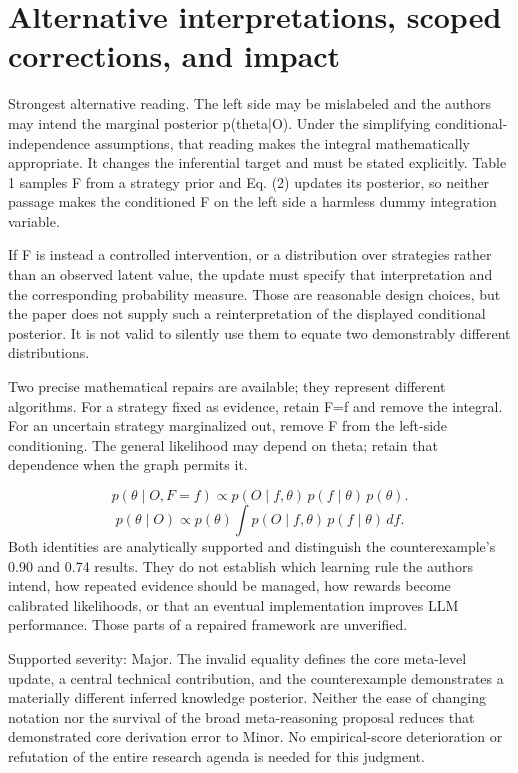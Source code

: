 \documentclass[10pt]{article}
\begin{document}
\section*{Alternative interpretations, scoped corrections, and impact}
Strongest alternative reading. The left side may be mislabeled and the authors may intend the marginal posterior p(theta|O). Under the simplifying conditional-independence assumptions, that reading makes the integral mathematically appropriate. It changes the inferential target and must be stated explicitly. Table 1 samples F from a strategy prior and Eq. (2) updates its posterior, so neither passage makes the conditioned F on the left side a harmless dummy integration variable.\par
If F is instead a controlled intervention, or a distribution over strategies rather than an observed latent value, the update must specify that interpretation and the corresponding probability measure. Those are reasonable design choices, but the paper does not supply such a reinterpretation of the displayed conditional posterior. It is not valid to silently use them to equate two demonstrably different distributions.\par
Two precise mathematical repairs are available; they represent different algorithms. For a strategy fixed as evidence, retain F=f and remove the integral. For an uncertain strategy marginalized out, remove F from the left-side conditioning. The general likelihood may depend on theta; retain that dependence when the graph permits it.\par
\[p(\theta\mid O,F=f)\propto p(O\mid f,\theta)\,p(f\mid\theta)\,p(\theta).\] \[p(\theta\mid O)\propto p(\theta)\int p(O\mid f,\theta)\,p(f\mid\theta)\,df.\] Both identities are analytically supported and distinguish the counterexample’s 0.90 and 0.74 results. They do not establish which learning rule the authors intend, how repeated evidence should be managed, how rewards become calibrated likelihoods, or that an eventual implementation improves LLM performance. Those parts of a repaired framework are unverified.\par
Supported severity: Major. The invalid equality defines the core meta-level update, a central technical contribution, and the counterexample demonstrates a materially different inferred knowledge posterior. Neither the ease of changing notation nor the survival of the broad meta-reasoning proposal reduces that demonstrated core derivation error to Minor. No empirical-score deterioration or refutation of the entire research agenda is needed for this judgment.\par
\end{document}
